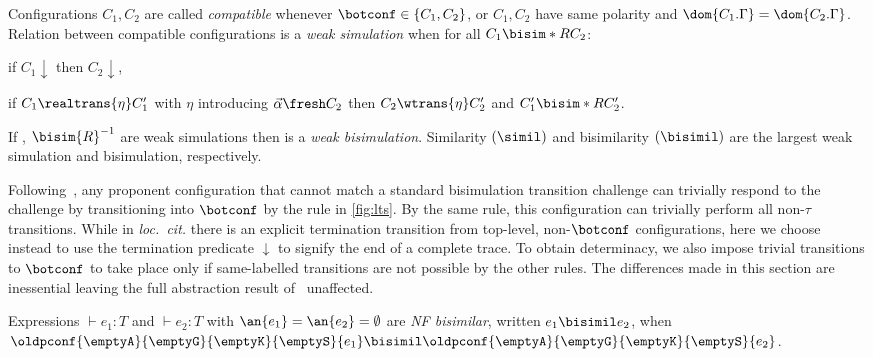 \begin{definition}[NF Bisimulation]\label{def:bisim}
    Configurations $C_1,C_2$ are called \emph{compatible} whenever $\botconf\in\{C_1,C_2\}$, or
  $C_1,C_2$ have same polarity and $\dom{C_1.\Gamma}=\dom{C_2.\Gamma}$.
Relation  between compatible configurations is a \emph{weak simulation} when
  for all $C_1 \bisim*{R} C_2$:
  \begin{compactitem}
    \item if $C_1\downarrow$ then $C_2\downarrow$,
   \item if $C_1 \realtrans{\eta} C_1'$ with $\eta$ introducing $\vec\alpha\fresh C_2$ then  $C_2 \wtrans{\eta} C_2'$ and $C_1' \bisim*{R} C_2'$.
\end{compactitem}
  If , $\bisim{R}^{-1}$ are weak simulations then
   is a \emph{weak bisimulation}.
  Similarity $(\simil)$ and bisimilarity $(\bisimil)$ are the largest weak 
  simulation and bisimulation, respectively.
\end{definition}


\begin{remark}\label{rem:bots}
 Following~\cite{KoutavasLT22}, 
any proponent configuration that cannot match a standard bisimulation transition challenge can trivially respond to the challenge by transitioning into $\botconf$ by the  rule in \cref{fig:lts}.
By the same rule, this configuration can trivially perform all non-$\tau$ transitions.
%
  While in \emph{loc.~cit.} there is an {explicit termination transition from top-level, non-$\botconf$ configurations, here we choose instead to use the termination predicate $\downarrow$ to signify the end of a complete trace}.
{To obtain determinacy, we also impose trivial transitions to $\botconf$ to take place only if same-labelled transitions are not possible by the other rules.
The differences made in this section are inessential
  leaving the full abstraction result of~\cite{KoutavasLT22} unaffected.}
\end{remark}
%
\begin{definition}
  Expressions $\vdash e_1: T$ and $\vdash e_2: T$
with $\an{e_1}=\an{e_2}=\emptyset$
  are \emph{NF bisimilar}, written $e_1 \bisimil e_2$, when 
  $\oldpconf{\emptyA}{\emptyG}{\emptyK}{\emptyS}{e_1} \bisimil
  \oldpconf{\emptyA}{\emptyG}{\emptyK}{\emptyS}{e_2}$.
\end{definition}

